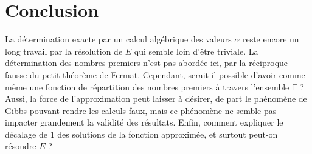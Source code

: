 \documentclass{article}
\begin{document}
\section{Conclusion}
La détermination exacte par un calcul algébrique des valeurs $\alpha$ reste encore un long travail par la résolution de $E$ qui semble loin d'être triviale. La détermination des nombres premiers n'est pas abordée ici, par la réciproque fausse du petit théorème de Fermat. Cependant, serait-il possible d'avoir comme même une fonction de répartition des nombres premiers à travers l'ensemble $\mathbb{E}$ ? Aussi, la force de l'approximation peut laisser à désirer, de part le phénomène de Gibbs pouvant rendre les calculs faux, mais ce phénomène ne semble pas impacter grandement la validité des résultats. Enfin, comment expliquer le décalage de 1 des solutions de la fonction approximée, et surtout peut-on résoudre $E$ ?
\end{document}
